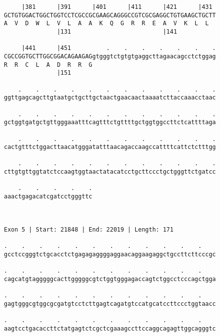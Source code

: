 \documentclass{article}
\begin{document}
\begin{Verbatim}
     |381      |391      |401      |411      |421      |431 
GCTGTGGACTGGCTGGTCCTCGCCGCGAAGCAGGGCCGTCGCGAGGCTGTGAAGCTGCTT
A  V  D  W  L  V  L  A  A  K  Q  G  R  R  E  A  V  K  L  L  
               |131                          |141           
  
     |441      |451          .    .    .    .    .    .    .
CGCCGGTGCTTGGCGGACAGAAGAGgtgggtctgtgtgaggcttagaacagcctctggag
R  R  C  L  A  D  R  R  G                                   
               |151                                         
  
    .    .    .    .    .    .    .    .    .    .    .    .
ggttgagcagcttgtaatgctgcttgctaactgaacaactaaaatcttaccaaacctaac
                                                            
    .    .    .    .    .    .    .    .    .    .    .    .
gctggtgatgctgttgggaaatttcagtttctgttttgctggtggccttctcattttaga
                                                            
    .    .    .    .    .    .    .    .    .    .    .    .
cactgtttctggacttaacatgggatatttaacagaccaagccattttcattctctttgg
                                                            
    .    .    .    .    .    .    .    .    .    .    .    .
cttgtgttggtatctccaagtggtaactatacatcctgcttccctgctgggttctgatcc
                                                            
    .    .    .    .    .
aaactgagacatcgatcctgggttc
                         
                         
 
Exon 5 | Start: 21848 | End: 22019 | Length: 171
 
.    .    .    .    .    .    .    .    .    .    .    .    
gcctccgggtctgcacctctgagagaggggaggaacaggaagaggctgccttcttcccgc
                                                            
.    .    .    .    .    .    .    .    .    .    .    .    
cagcatgtagggggcacttgggggcgtctggtgggagaccagtctggcctcccagctgga
                                                            
.    .    .    .    .    .    .    .    .    .    .    .    
gagtgggcgtggcgcgatgtcctcttgagtcagatgtccatgcatccttccctggtaacc
                                                            
.    .    .    .    .    .    .    .    .    .    .    .    
aagtcctgacaccttctatgagtctcgctcgaaagccttccaggcagagttggcagggtc
                                                            

\end{Verbatim}
\end{document}
